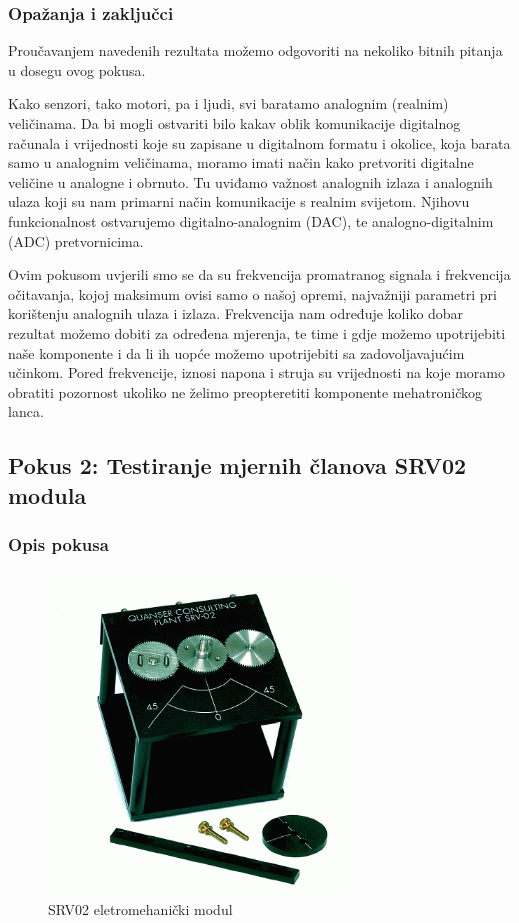 \documentclass[12pt,a4paper]{article}
\begin{document}
\newpage
\subsubsection{Opažanja i zaključci}
Proučavanjem navedenih rezultata možemo odgovoriti na nekoliko bitnih pitanja u dosegu ovog pokusa.

Kako senzori, tako motori, pa i ljudi, svi baratamo analognim (realnim) veličinama. Da bi mogli ostvariti bilo kakav oblik komunikacije digitalnog računala i vrijednosti koje su zapisane u digitalnom formatu i okolice, koja barata samo u analognim veličinama, moramo imati način kako pretvoriti digitalne veličine u analogne i obrnuto. 
Tu uviđamo važnost analognih izlaza i analognih ulaza koji su nam primarni način komunikacije s realnim svijetom. Njihovu funkcionalnost ostvarujemo digitalno-analognim (DAC), te analogno-digitalnim (ADC) pretvornicima.

Ovim pokusom uvjerili smo se da su frekvencija promatranog signala i frekvencija očitavanja, kojoj maksimum ovisi samo o našoj opremi, najvažniji parametri pri korištenju analognih ulaza i izlaza. Frekvencija nam određuje koliko dobar rezultat možemo dobiti za određena mjerenja, te time i gdje možemo upotrijebiti naše komponente i da li ih uopće možemo upotrijebiti sa zadovoljavajućim učinkom.
Pored frekvencije, iznosi napona i struja su vrijednosti na koje moramo obratiti pozornost ukoliko ne želimo preopteretiti komponente mehatroničkog lanca.

\newpage

\subsection{Pokus 2: Testiranje mjernih članova SRV02 modula}
\subsubsection{Opis pokusa}

\begin{figure}[!ht]
	\begin{center}
	\includegraphics[width=0.7\textwidth] {SRV02.png}
    \caption{SRV02 eletromehanički modul}
    \end{center}
\end{figure}
\end{document}
